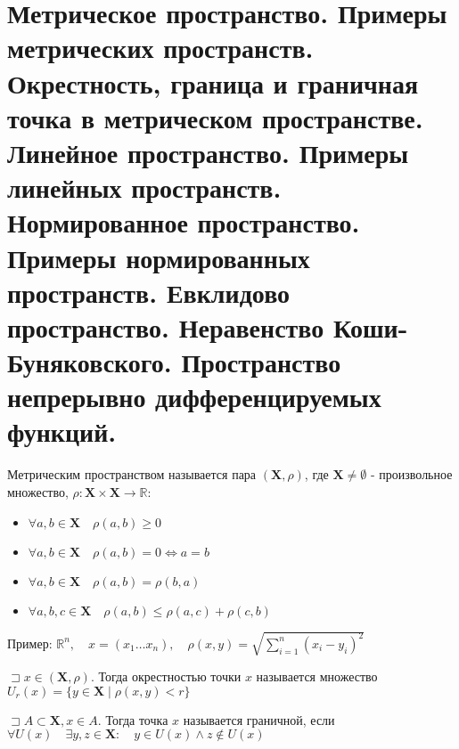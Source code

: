 \documentclass[__main__.tex]{subfiles}
\begin{document}
\section{Метрическое пространство. Примеры метрических пространств. Окрестность, граница и граничная точка в метрическом пространстве. Линейное пространство. Примеры линейных пространств. Нормированное пространство. Примеры нормированных пространств. Евклидово пространство. Неравенство Коши-Буняковского. Пространство непрерывно дифференцируемых функций.}

\begin{definition}
	Метрическим пространством называется пара $(\mathbf{X},\rho)$, где $\mathbf{X}\ne\emptyset$ - произвольное множество, $\rho:\mathbf{X}\times\mathbf{X}\rightarrow\mathbb{R}$:
	\begin{itemize}
		\item $\forall a,b\in\mathbf{X}\quad\rho(a,b)\ge 0$
		\item $\forall a,b\in\mathbf{X}\quad\rho(a,b)=0\Leftrightarrow a=b$
		\item $\forall a,b\in\mathbf{X}\quad\rho(a,b)=\rho(b,a)$
		\item $\forall a,b,c\in\mathbf{X}\quad\rho(a,b)\le\rho(a,c)+\rho(c,b)$
	\end{itemize}
\end{definition}
Пример: $\mathbb{R}^n,\quad x=(x_1\dots x_n),\quad\rho(x,y)=\sqrt{\sum\limits_{i=1}^n(x_i-y_i)^2}$
\begin{definition}[Окрестность]
	$\sqsupset x\in\left(\mathbf{X},\rho\right)$. Тогда окрестностью точки $x$ называется множество $U_r(x)=\{y\in\mathbf{X}\mid\rho(x,y)<r\}$
\end{definition}
\begin{definition}
	$\sqsupset A\subset\mathbf{X},x\in A.$ Тогда точка $x$ называется граничной, если\\ $\forall U(x)\quad\exists y,z\in\mathbf{X}:\quad y\in U(x)\wedge z\not\in U(x)$
\end{definition}
\end{document}
